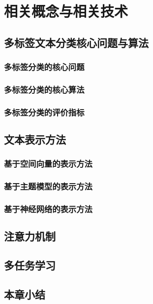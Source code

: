 
\chapter{相关概念与相关技术}

\section{多标签文本分类核心问题与算法}
\subsection{多标签分类的核心问题}
\subsection{多标签分类的核心算法}
\subsection{多标签分类的评价指标}

\section{文本表示方法}
\subsection{基于空间向量的表示方法}
\subsection{基于主题模型的表示方法}
\subsection{基于神经网络的表示方法}

\section{注意力机制}


\section{多任务学习}

\section{本章小结}


